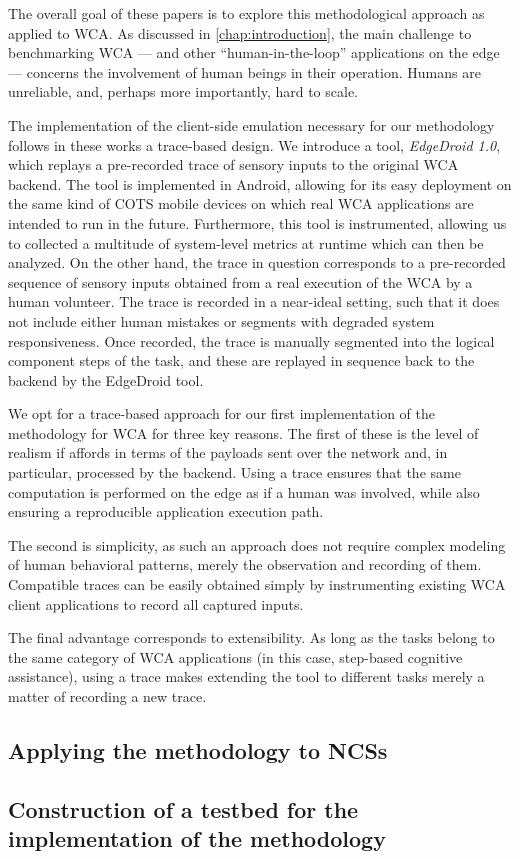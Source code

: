 The overall goal of these papers is to explore this methodological approach as applied to \gls{WCA}.
As discussed in \cref{chap:introduction}, the main challenge to benchmarking \gls{WCA} --- and other ``human-in-the-loop'' applications on the edge --- concerns the involvement of human beings in their operation.
Humans are unreliable, and, perhaps more importantly, hard to scale.

The implementation of the client-side emulation necessary for our methodology follows in these works a trace-based design.
We introduce a tool, \emph{EdgeDroid \num{1.0}}, which replays a pre-recorded trace of sensory inputs to the original \gls{WCA} backend.
The tool is implemented in Android, allowing for its easy deployment on the same kind of \gls{COTS} mobile devices on which real \gls{WCA} applications are intended to run in the future.
Furthermore, this tool is instrumented, allowing us to collected a multitude of system-level metrics at runtime which can then be analyzed.
On the other hand, the trace in question corresponds to a pre-recorded sequence of sensory inputs obtained from a real execution of the \gls{WCA} by a human volunteer.
The trace is recorded in a near-ideal setting, such that it does not include either human mistakes or segments with degraded system responsiveness.
Once recorded, the trace is manually segmented into the logical component steps of the task, and these are replayed in sequence back to the backend by the EdgeDroid tool.

We opt for a trace-based approach for our first implementation of the methodology for \gls{WCA} for three key reasons.
The first of these is the level of realism if affords in terms of the payloads sent over the network and, in particular, processed by the backend.
Using a trace ensures that the same computation is performed on the edge as if a human was involved, while also ensuring a reproducible application execution path.

The second is simplicity, as such an approach does not require complex modeling of human behavioral patterns, merely the observation and recording of them.
Compatible traces can be easily obtained simply by instrumenting existing \gls{WCA} client applications to record all captured inputs.

The final advantage corresponds to extensibility.
As long as the tasks belong to the same category of \gls{WCA} applications (in this case, step-based cognitive assistance), using a trace makes extending the tool to different tasks merely a matter of recording a new trace.

\todo[inline]{}

\subsection{Applying the methodology to \acsp{NCS}}

\todo[inline]{}

\subsection{Construction of a testbed for the implementation of the methodology}

\todo[inline]{}
